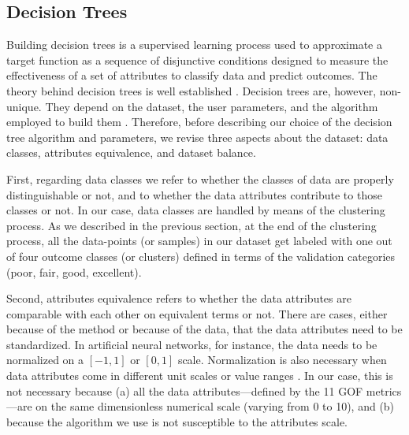
\subsection{Decision Trees}
\label{sec:decision-tree}

Building decision trees is a supervised learning process used to approximate a target function as a sequence of disjunctive conditions designed to measure the effectiveness of a set of attributes to classify data and predict outcomes. The theory behind decision trees is well established \citep[e.g.,][]{Quinlan_1986_ML, Quinlan_1993_Book, Mitchell_1997_Book}.
Decision trees are, however, non-unique. They depend on the dataset, the user parameters, and the algorithm employed to build them \citep{Murthy_1998_DMKD}. Therefore, before describing our choice of the decision tree algorithm and parameters, we revise three aspects about the dataset: data classes, attributes equivalence, and dataset balance.

First, regarding data classes we refer to whether the classes of data are properly distinguishable or not, and to whether the data attributes contribute to those classes or not. In our case, data classes are handled by means of the clustering process. As we described in the previous section, at the end of the clustering process, all the data-points (or samples) in our dataset get labeled with one out of four outcome classes (or clusters) defined in terms of the validation categories (poor, fair, good, excellent).

Second, attributes equivalence refers to whether the data attributes are comparable with each other on equivalent terms or not. There are cases, either because of the method or because of the data, that the data attributes need to be standardized. In artificial neural networks, for instance, the data needs to be normalized on a $[-1,1]$ or $[0,1]$ scale. Normalization is also necessary when data attributes come in different unit scales or value ranges \citep[e.g.,][]{Wu_2010_JH}. In our case, this is not necessary because (a) all the data attributes---defined by the 11 GOF metrics---are on the same dimensionless numerical scale (varying from 0 to 10), and (b) because the algorithm we use is not susceptible to the attributes scale.

